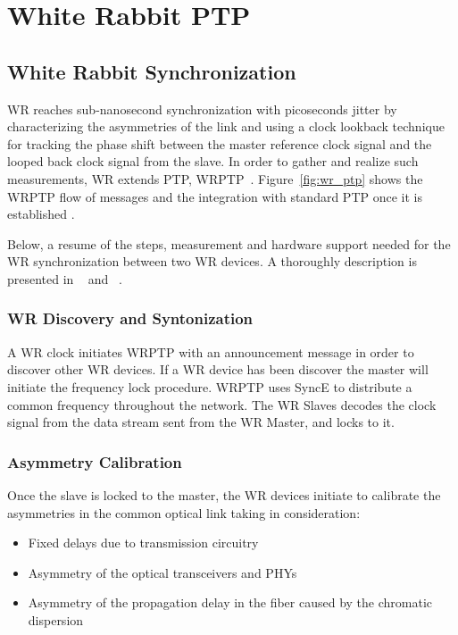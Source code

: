 \section{White Rabbit PTP}
\label{sec:wr}

\subsection{White Rabbit Synchronization}
WR reaches sub-nanosecond synchronization with  picoseconds jitter by
characterizing the asymmetries of the link and using a clock lookback
technique for tracking the phase shift between the master reference clock
signal and the looped back clock signal from the slave. In order to gather and
realize such measurements, WR extends PTP, WRPTP~\cite{biblio:ispcs_m}. 
Figure~\ref{fig:wr_ptp} shows the WRPTP flow of messages and the
integration with standard PTP once it is established .

Below, a resume of the steps, measurement and hardware support needed for the 
WR synchronization between two WR devices. A thoroughly description is presented 
in ~\cite{biblio:tomas} and ~\cite{biblio:wrptp}.

\subsubsection{WR Discovery and Syntonization}

A WR clock initiates WRPTP with an announcement message in order to discover
other WR devices. If a WR device has been discover the master will initiate the 
frequency lock procedure. WRPTP uses SyncE to distribute a common frequency throughout 
the network. The WR Slaves decodes the clock signal from the data stream sent
from the WR Master, and locks to it.

\subsubsection{Asymmetry Calibration}

Once the slave is locked to the master, the WR devices initiate to calibrate the 
asymmetries in the common optical link taking in consideration:

\begin{itemize}
    \item Fixed delays due to transmission circuitry
    \item Asymmetry of the optical transceivers and PHYs 
    \item Asymmetry of the propagation delay in the fiber caused by the chromatic dispersion
\end{itemize}

